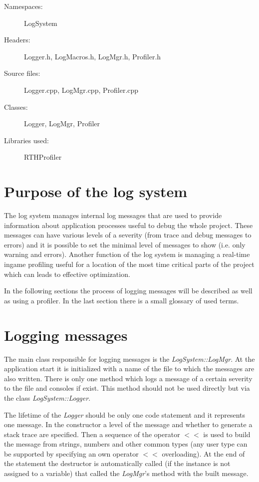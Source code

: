 \begin{description}
  \item[Namespaces:] LogSystem
  \item[Headers:] Logger.h, LogMacros.h, LogMgr.h, Profiler.h
  \item[Source files:] Logger.cpp, LogMgr.cpp, Profiler.cpp
  \item[Classes:] Logger, LogMgr, Profiler
  \item[Libraries used:] RTHProfiler
\end{description}

\section{Purpose of the log system}

The log system manages internal log messages that are used to provide information about application processes useful to debug the whole project. These messages can have various levels of a severity (from trace and debug messages to errors) and it is possible to set the minimal level of messages to show (i.e. only warning and errors). Another function of the log system is managing a real-time ingame profiling useful for a location of the most time critical parts of the project which can leads to effective optimization.

In the following sections the process of logging messages will be described as well as using a profiler. In the last section there is a small glossary of used terms.

\section{Logging messages}

The main class responsible for logging messages is the \emph{LogSystem::LogMgr}. At the application start it is initialized with a name of the file to which the messages are also written. There is only one method which logs a message of a certain severity to the file and consoles if exist. This method should not be used directly but via the class \emph{LogSystem::Logger}.

The lifetime of the \emph{Logger} should be only one code statement and it represents one message. In the constructor a level of the message and whether to generate a stack trace are specified. Then a sequence of the operator $<<$ is used to build the message from strings, numbers and other common types (any user type can be supported by specifying an own operator $<<$ overloading). At the end of the statement the destructor is automatically called (if the instance is not assigned to a variable) that called the \emph{LogMgr}'s method with the built message.

